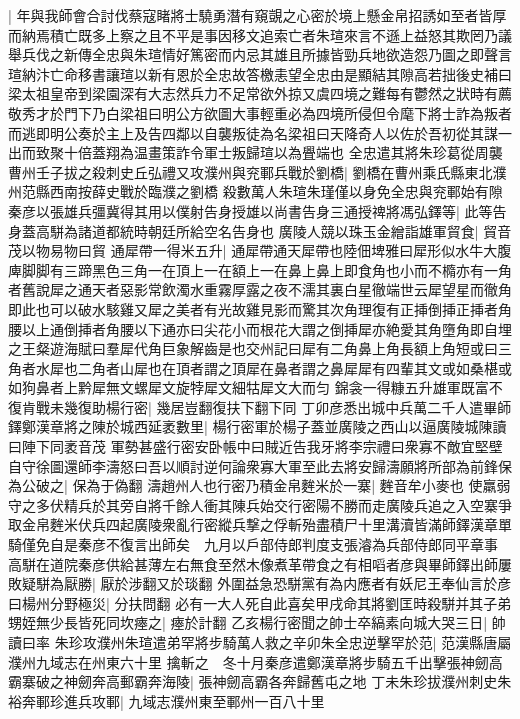 |{
	年與我師會合討伐蔡寇睹將士驍勇潛有窺覬之心密於境上懸金帛招誘如至者皆厚而納焉積亡既多上察之且不平是事因移文追索亡者朱瑄來言不遜上益怒其欺罔乃議舉兵伐之新傳全忠與朱瑄情好篤密而内忌其雄且所據皆勁兵地欲造怨乃圖之即聲言瑄納汴亡命移書讓瑄以新有恩於全忠故答檄恚望全忠由是顯結其隙高若拙後史補曰梁太祖皇帝到梁園深有大志然兵力不足常欲外掠又虞四境之難每有鬱然之狀時有薦敬秀才於門下乃白梁祖曰明公方欲圖大事輕重必為四境所侵但令麾下將士詐為叛者而逃即明公奏於主上及告四鄰以自襲叛徒為名梁祖曰天降奇人以佐於吾初從其謀一出而致聚十倍蓋翔為温畫策詐令軍士叛歸瑄以為舋端也}
全忠遣其將朱珍葛從周襲曹州壬子拔之殺刺史丘弘禮又攻濮州與兖鄆兵戰於劉橋|{
	劉橋在曹州乘氏縣東北濮州范縣西南按薛史戰於臨濮之劉橋}
殺數萬人朱瑄朱瑾僅以身免全忠與兖鄆始有隙　秦彦以張雄兵彊冀得其用以僕射告身授雄以尚書告身三通授禆將馮弘鐸等|{
	此等告身蓋高駢為諸道都統時朝廷所給空名告身也}
廣陵人競以珠玉金繒詣雄軍貿食|{
	貿音茂以物易物曰貿}
通犀帶一得米五升|{
	通犀帶通天犀帶也陸佃埤雅曰犀形似水牛大腹庳脚脚有三蹄黑色三角一在頂上一在額上一在鼻上鼻上即食角也小而不橢亦有一角者舊說犀之通天者惡影常飲濁水重霧厚露之夜不濡其裏白星徹端世云犀望星而徹角即此也可以破水駭雞又犀之美者有光故雞見影而驚其次角理復有正挿倒挿正挿者角腰以上通倒挿者角腰以下通亦曰尖花小而根花大謂之倒挿犀亦絶愛其角墮角即自埋之王粲遊海賦曰羣犀代角巨象解齒是也交州記曰犀有二角鼻上角長額上角短或曰三角者水犀也二角者山犀也在頂者謂之頂犀在鼻者謂之鼻犀犀有四輩其文或如桑椹或如狗鼻者上黔犀無文螺犀文旋㹀犀文細牯犀文大而匀}
錦衾一得糠五升雄軍既富不復肯戰未幾復助楊行密|{
	幾居豈翻復扶下翻下同}
丁卯彦悉出城中兵萬二千人遣畢師鐸鄭漢章將之陳於城西延袤數里|{
	楊行密軍於楊子蓋並廣陵之西山以逼廣陵城陳讀曰陣下同袤音茂}
軍勢甚盛行密安卧帳中曰賊近告我牙將李宗禮曰衆寡不敵宜堅壁自守徐圖還師李濤怒曰吾以順討逆何論衆寡大軍至此去將安歸濤願將所部為前鋒保為公破之|{
	保為于偽翻}
濤趙州人也行密乃積金帛麰米於一寨|{
	麰音牟小麥也}
使羸弱守之多伏精兵於其旁自將千餘人衝其陳兵始交行密陽不勝而走廣陵兵追之入空寨爭取金帛麰米伏兵四起廣陵衆亂行密縱兵撃之俘斬殆盡積尸十里溝瀆皆滿師鐸漢章單騎僅免自是秦彦不復言出師矣　九月以戶部侍郎判度支張濬為兵部侍郎同平章事　高駢在道院秦彦供給甚薄左右無食至然木像煮革帶食之有相㗖者彦與畢師鐸出師屢敗疑駢為厭勝|{
	厭於涉翻又於琰翻}
外圍益急恐駢黨有為内應者有妖尼王奉仙言於彦曰楊州分野極災|{
	分扶問翻}
必有一大人死自此喜矣甲戌命其將劉匡時殺駢并其子弟甥姪無少長皆死同坎瘞之|{
	瘞於計翻}
乙亥楊行密聞之帥士卒縞素向城大哭三日|{
	帥讀曰率}
朱珍攻濮州朱瑄遣弟罕將步騎萬人救之辛卯朱全忠逆擊罕於范|{
	范漢縣唐屬濮州九域志在州東六十里}
擒斬之　冬十月秦彦遣鄭漢章將步騎五千出擊張神劒高霸寨破之神劒奔高郵霸奔海陵|{
	張神劒高霸各奔歸舊屯之地}
丁未朱珍拔濮州刺史朱裕奔鄆珍進兵攻鄆|{
	九域志濮州東至鄆州一百八十里}
